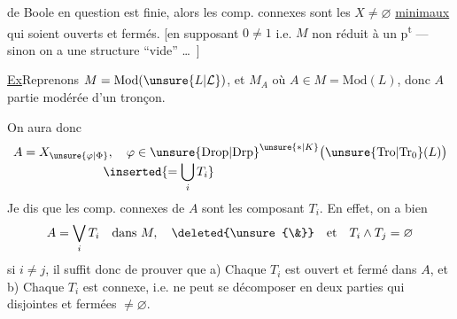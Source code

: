 de Boole en question est finie, alors les comp. connexes sont les  $X\ne\varnothing$ \uline{minimaux} qui soient ouverts et fermés. [en supposant $0\ne1$
i.e. $M$ non réduit à un p\textsuperscript{t} --- sinon on a   une structure ``vide'' \ldots\ ]

\uline{Ex}\qquad Reprenons $M=\mathrm{Mod}(\unsure{L|\mathcal L})$, et $M_A$ où $A\in M=\mathrm{Mod}(L)$, donc $A$ partie modérée d'un tronçon.

On aura donc
\[
\begin{aligned}
A=X_{\unsure{\varphi|\Phi}} &,\quad
\varphi\in{\unsure{\mathrm{Drop}|\mathrm{Drp}}}^{\unsure{*|K}}
  \bigl(\unsure{\mathrm{Tro}|\mathrm{Tr}_0}(L)\bigr)\\[-0.6ex]
 &\mkern-8mu\inserted{=\bigcup_i T_i}
\end{aligned}
\]
Je dis que les comp. connexes de $A$ sont les  composant $T_i$.
En effet, on a bien 
\[
A=\bigvee_i T_i\quad\text{dans }M,\quad\deleted{\unsure{\&}}\quad\text{et}\quad T_i\wedge T_j=\varnothing
\]
si $i\ne j$, il suffit donc de prouver que a) Chaque $T_i$ est ouvert et fermé dans $A$, et b) Chaque $T_i$ est connexe, i.e. ne peut se décomposer en deux parties qui  disjointes et  fermées $\ne\varnothing$.

